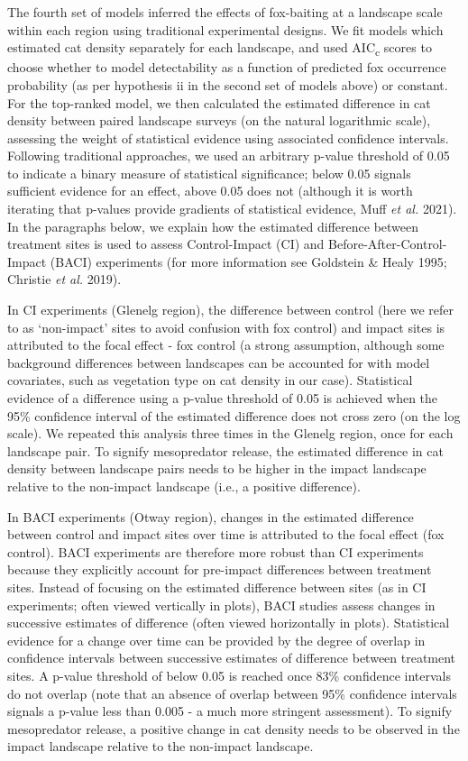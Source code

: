 \documentclass[11pt,a4paper,titlepage,twoside,openright]{style/unimelbthesis}
\begin{document}
\begin{mainmatter}
The fourth set of models inferred the effects of fox-baiting at a landscape scale within each region using traditional experimental designs. We fit models which estimated cat density separately for each landscape, and used AIC\textsubscript{c} scores to choose whether to model detectability as a function of predicted fox occurrence probability (as per hypothesis ii in the second set of models above) or constant. For the top-ranked model, we then calculated the estimated difference in cat density between paired landscape surveys (on the natural logarithmic scale), assessing the weight of statistical evidence using associated confidence intervals. Following traditional approaches, we used an arbitrary p-value threshold of 0.05 to indicate a binary measure of statistical significance; below 0.05 signals sufficient evidence for an effect, above 0.05 does not (although it is worth iterating that p-values provide gradients of statistical evidence, Muff \emph{et al.} 2021). In the paragraphs below, we explain how the estimated difference between treatment sites is used to assess Control-Impact (CI) and Before-After-Control-Impact (BACI) experiments (for more information see Goldstein \& Healy 1995; Christie \emph{et al.} 2019).

In CI experiments (Glenelg region), the difference between control (here we refer to as `non-impact' sites to avoid confusion with fox control) and impact sites is attributed to the focal effect - fox control (a strong assumption, although some background differences between landscapes can be accounted for with model covariates, such as vegetation type on cat density in our case). Statistical evidence of a difference using a p-value threshold of 0.05 is achieved when the 95\% confidence interval of the estimated difference does not cross zero (on the log scale). We repeated this analysis three times in the Glenelg region, once for each landscape pair. To signify mesopredator release, the estimated difference in cat density between landscape pairs needs to be higher in the impact landscape relative to the non-impact landscape (i.e., a positive difference).

In BACI experiments (Otway region), changes in the estimated difference between control and impact sites over time is attributed to the focal effect (fox control). BACI experiments are therefore more robust than CI experiments because they explicitly account for pre-impact differences between treatment sites. Instead of focusing on the estimated difference between sites (as in CI experiments; often viewed vertically in plots), BACI studies assess changes in successive estimates of difference (often viewed horizontally in plots). Statistical evidence for a change over time can be provided by the degree of overlap in confidence intervals between successive estimates of difference between treatment sites. A p-value threshold of below 0.05 is reached once 83\% confidence intervals do not overlap (note that an absence of overlap between 95\% confidence intervals signals a p-value less than 0.005 - a much more stringent assessment). To signify mesopredator release, a positive change in cat density needs to be observed in the impact landscape relative to the non-impact landscape.


\end{mainmatter}
\end{document}
